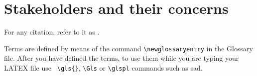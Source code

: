 \section{Stakeholders and their concerns}

For any citation, refer to it as \cite{younis2021hybrid}.

Terms are defined by means of the command \verb|\newglossaryentry| in the Glossary file. After you have defined the terms, to use them while you are typing your LATEX file use \verb| \gls{}|, \verb|\Gls| or \verb|\glspl| commands such as \gls{sad}. 




